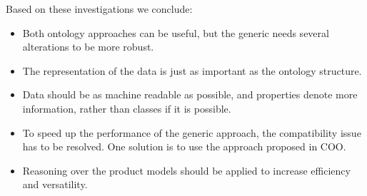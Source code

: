 \documentclass{llncs}
\begin{document}
Based on these investigations we conclude:
\begin{itemize}
 \item Both ontology approaches can be useful, but the generic needs several alterations to be more robust.
 \item The representation of the data is just as important as the ontology structure.
 \item Data should be as machine readable as possible, and properties denote more information, rather than classes if it is possible.
 \item To speed up the performance of the generic approach, the compatibility issue has to be resolved. One solution is to use the approach proposed in COO.
 \item Reasoning over the product models should be applied to increase efficiency and versatility.
\end{itemize}
\end{document}
